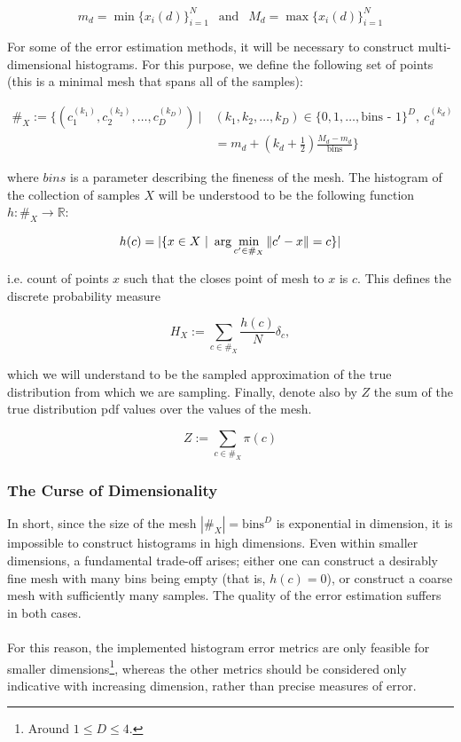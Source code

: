 $$ 
    m_d = \min \{x_i(d)\}_{i=1}^N \ \ \text{ and } \ \ M_d = \max \{x_i(d)\}_{i=1}^N
$$

For some of the error estimation methods, it will be necessary to construct multi-dimensional histograms. For this purpose, we define the following set of points (this is a minimal mesh that spans all of the samples):

\begin{align*}
    \#_X := \Big\{ \left(c_1^{(k_1)}, c_2^{(k_2)}, \dots, c_D^{(k_D)}\right)\ |\ &(k_1, k_2, \dots, k_D) \in \lbrace 0, 1, \dots, \text{bins - 1}\rbrace^D, \ c_d^{(k_d)} \\
    &= m_d + \left(k_d + \frac 1 2\right) \frac{M_d - m_d}{\text{bins}} \Big\}
\end{align*}

where $bins$ is a parameter describing the fineness of the mesh. The histogram of the collection of samples $X$ will be understood to be the following function $h: \#_X \rightarrow \mathbb R$:

$$
    h(c) = |\{x \in X\ |\ \arg \min_{c' \in \#_X} \norm{c' - x} = c \}|
$$

i.e. count of points $x$ such that the closes point of mesh to $x$ is $c$. This defines the discrete probability measure 

$$H_X := \sum_{c \in \#_X} \frac {h(c)} N   \delta_c,$$

which we will understand to be the sampled approximation of the true distribution from which we are sampling. Finally, denote also by $Z$ the sum of the true distribution pdf values over the values of the mesh.

\[Z := \sum_{c \in \#_X} \pi(c)\]



\subsubsection{The Curse of Dimensionality}

In short, since the size of the mesh $|\#_X| = \text{bins}^D$ is exponential in dimension, it is impossible to construct histograms in high dimensions. Even within smaller dimensions, a fundamental trade-off arises; either one can construct a desirably fine mesh with many bins being empty (that is, $h(c) = 0$), or construct a coarse mesh with sufficiently many samples. The quality of the error estimation suffers in both cases. \\\\
For this reason, the implemented  histogram  error metrics are only feasible for smaller dimensions\footnote{Around $1 \leq D \leq 4$.}, whereas the other metrics should be considered only indicative with increasing dimension, rather than precise measures of error.

